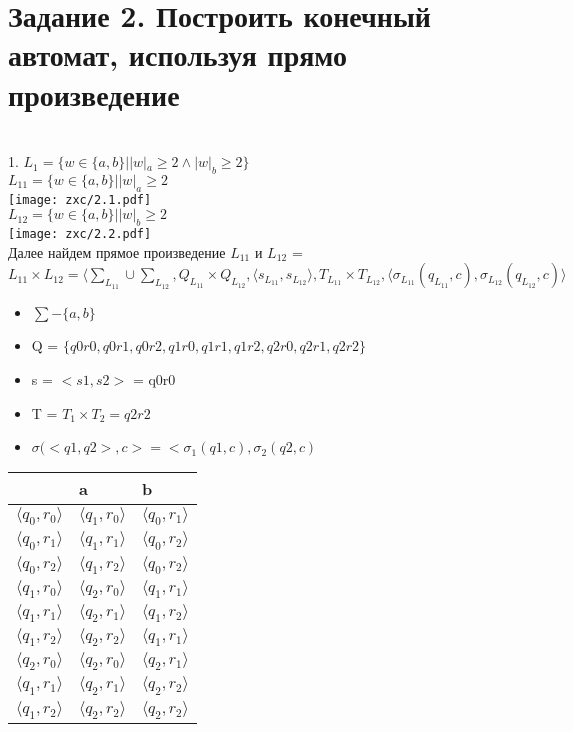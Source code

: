 \documentclass{article}
\begin{document}
  \section{Задание 2. Построить конечный автомат, используя прямо произведение}\\
  1. $L_1 = \{w \in \{a,b\} | |w|_a \geq 2 \wedge |w|_b \geq 2 \} $\\
  $L_{11} = \{w \in \{a,b\} | |w|_a \geq 2$\\
  \texttt{[image: zxc/2.1.pdf]}\\
  $L_{12} = \{w \in \{a,b\} | |w|_b \geq 2$\\
  \texttt{[image: zxc/2.2.pdf]}\\
  Далее найдем прямое произведение $L_{11}$ и $L_{12}$ = \\
  $L_{11}\times L_{12}=\langle \sum_L_{11}\cup\sum_L_{12}, Q_L_{11}\times Q_L_{12}, \langle s_L_{11},s_L_{12}\rangle, T_L_{11}\times T_L_{12}, \langle\sigma_L_{11}(q_L_{11},c),\sigma_L_{12}(q_L_{12},c) \rangle$
  \begin{itemize}
      \item $\sum - \{a,b\}$\\
      \item Q = $\{q0r0,q0r1,q0r2,q1r0,q1r1,q1r2,q2r0,q2r1,q2r2\}$\\
      \item s = $<s1,s2>$ = q0r0\\
      \item T = $T_1 \times T_2 = q2r2 $\\
      \item $\sigma(<q1,q2>,c> =  < \sigma_1(q1,c),\sigma_2(q2,c)$\\
  \end{itemize}
			\begin{tabular}{ | l | l | l | }
				\hline
				& a & b \\ \hline
				$\langle q_0,r_0\rangle$ & $\langle q_1,r_0\rangle$ & $\langle q_0,r_1\rangle$ \\
				$\langle q_0,r_1\rangle$ & $\langle q_1,r_1\rangle$ & $\langle q_0,r_2\rangle$ \\
				$\langle q_0,r_2\rangle$ & $\langle q_1,r_2\rangle$ & $\langle q_0,r_2\rangle$ \\
				$\langle q_1,r_0\rangle$ & $\langle q_2,r_0\rangle$ & $\langle q_1,r_1\rangle$ \\
				$\langle q_1,r_1\rangle$ & $\langle q_2,r_1\rangle$ & $\langle q_1,r_2\rangle$ \\
				$\langle q_1,r_2\rangle$ & $\langle q_2,r_2\rangle$ & $\langle q_1,r_1\rangle$ \\
				$\langle q_2,r_0\rangle$ & $\langle q_2,r_0\rangle$ & $\langle q_2,r_1\rangle$ \\
				$\langle q_1,r_1\rangle$ & $\langle q_2,r_1\rangle$ & $\langle q_2,r_2\rangle$ \\
				$\langle q_1,r_2\rangle$ & $\langle q_2,r_2\rangle$ & $\langle q_2,r_2\rangle$ \\
				\hline
			\end{tabular}\\
\end{document}
